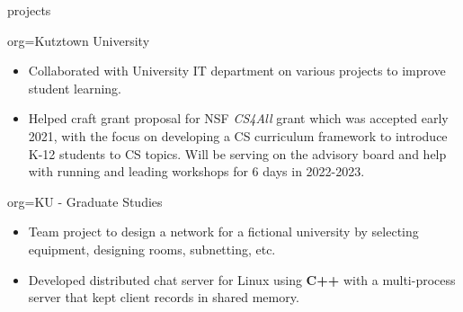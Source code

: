 \documentclass{resume}
\begin{document}
\begin{ResumeSection}{projects}
    \begin{ResumeSubsection}{org={Kutztown University}}
        \begin{itemize}
            \item Collaborated with University IT department on various projects to improve student learning. 
            \item Helped craft grant proposal for NSF \emph{CS4All} grant which was accepted early 2021,
            with the focus on developing a CS curriculum framework to introduce K-12 students to CS topics.  
            Will be serving on the advisory board and help with running and leading workshops for 6 days 
            in 2022-2023. 
        \end{itemize}
    \end{ResumeSubsection}
    \begin{ResumeSubsection}{org={KU - Graduate Studies}}
        \begin{itemize}
            \item Team project to design a network for a fictional university by selecting equipment, designing rooms, subnetting, etc.
            \item Developed distributed chat server for Linux using \textbf{C++} with a multi-process server that kept client records in shared memory.
        \end{itemize}
    \end{ResumeSubsection}
\end{ResumeSection}
\end{document}

